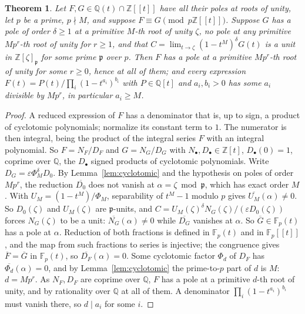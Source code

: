 \documentclass[11pt,a4paper]{article}
\newtheorem{theorem}{Theorem}[section]
\theoremstyle{definition}
\newcommand{\Q}{\mathbb{Q}}
\newcommand{\Z}{\mathbb{Z}}
\newcommand{\F}{\mathbb{F}}
\begin{document}
\begin{theorem}\label{thm:transfer}
Let $F,G\in\Q(t)\cap\Z[[t]]$ have all their poles at roots of unity, let $p$ be
a prime, $p\nmid M$, and suppose $F\equiv G\pmod{p\Z[[t]]}$. Suppose $G$ has a
pole of order $\delta\ge1$ at a primitive $M$-th root of unity $\zeta$, no pole
at any primitive $Mp^r$-th root of unity for $r\ge1$, and that
$C=\lim_{t\to\zeta}(1-t^M)^\delta G(t)$ is a unit in $\Z[\zeta]_{\mathfrak p}$
for some prime $\mathfrak p$ over $p$. Then $F$ has a pole at a primitive
$Mp^r$-th root of unity for some $r\ge0$, hence at all of them; and every
expression $F(t)=P(t)/\prod_i(1-t^{a_i})^{b_i}$ with $P\in\Q[t]$ and $a_i,b_i>0$
has some $a_i$ divisible by $Mp^r$, in particular $a_i\ge M$.
\end{theorem}

\begin{proof}
A reduced expression of $F$ has a denominator that is, up to sign, a product
of cyclotomic polynomials; normalize its constant term to $1$. The numerator is
then integral, being the product of the integral series $F$ with an integral
polynomial. So $F=N_F/D_F$ and $G=N_G/D_G$ with $N_\bullet,D_\bullet\in\Z[t]$,
$D_\bullet(0)=1$, coprime over $\Q$, the $D_\bullet$ signed products of
cyclotomic polynomials. Write $D_G=\varepsilon\Phi_M^\delta D_0$. By
Lemma~\ref{lem:cyclotomic} and the hypothesis on poles of order $Mp^r$, the
reduction $\overline{D_0}$ does not vanish at $\alpha=\zeta\bmod\mathfrak p$,
which has exact order $M$. With $U_M=(1-t^M)/\Phi_M$, separability of
$t^M-1$ modulo $p$ gives $\overline{U_M}(\alpha)\ne0$. So $D_0(\zeta)$ and
$U_M(\zeta)$ are $\mathfrak p$-units, and
$C=U_M(\zeta)^\delta N_G(\zeta)/(\varepsilon D_0(\zeta))$ forces
$N_G(\zeta)$ to be a unit: $\overline{N_G}(\alpha)\ne0$ while
$\overline{D_G}$ vanishes at $\alpha$. So $\overline G\in\F_p(t)$ has a pole
at $\alpha$. Reduction of both fractions is defined in $\F_p(t)$ and in
$\F_p[[t]]$, and the map from such fractions to series is injective; the
congruence gives $\overline F=\overline G$ in $\F_p(t)$, so
$\overline{D_F}(\alpha)=0$. Some cyclotomic factor $\Phi_d$ of $D_F$ has
$\overline{\Phi_d}(\alpha)=0$, and by Lemma~\ref{lem:cyclotomic} the prime-to-$p$
part of $d$ is $M$: $d=Mp^r$. As $N_F,D_F$ are coprime over $\Q$, $F$ has a
pole at a primitive $d$-th root of unity, and by rationality over $\Q$ at all
of them. A denominator $\prod_i(1-t^{a_i})^{b_i}$ must vanish there, so
$d\mid a_i$ for some $i$.
\end{proof}
\end{document}
